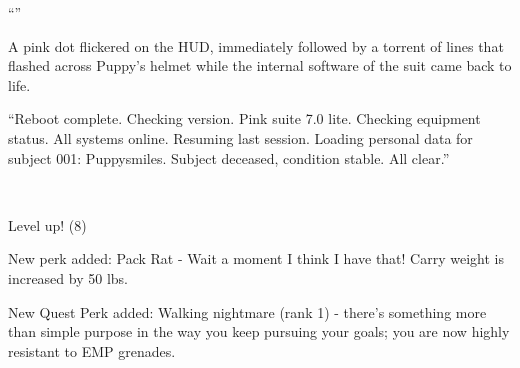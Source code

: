 ``''

A pink dot flickered on the HUD, immediately followed by a torrent of lines that flashed across Puppy's helmet while the internal software of the suit came back to life.

``{\mt Reboot complete. Checking version. Pink suite 7.0 lite. Checking equipment status. All systems online. Resuming last session. Loading personal data for subject 001: Puppysmiles. Subject deceased, condition stable. All clear.}''

~\vfill

\begin{engnote}
    Level up! (8)
    
    New perk added: Pack Rat - Wait a moment I think I have that! Carry weight is increased by 50 lbs.
    
    New Quest Perk added: Walking nightmare (rank 1) - there's something more than simple purpose in the way you keep pursuing your goals; you are now highly resistant to EMP grenades.
\end{engnote}


